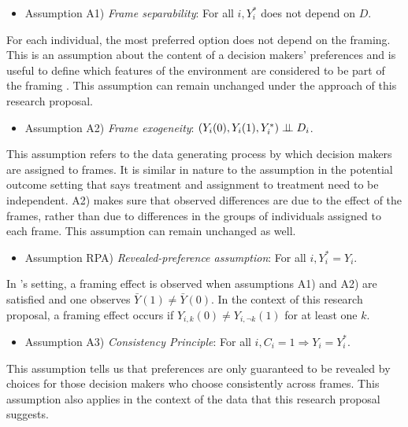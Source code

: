 \begin{itemize}
    \item Assumption A1) \textit{Frame separability}: For all $ i, Y^*_i $ does not depend on $D$.
\end{itemize}

For each individual, the most preferred option does not depend on the framing.
This is an assumption about the content of a decision makers' preferences and is 
useful to define which features of the environment are considered to be part of the framing \parencite[p. 2764]{goldin2020}. This assumption can
remain unchanged under the approach of this research proposal. 

\begin{itemize}
    \item Assumption A2) \textit{Frame exogeneity}: $ (Y_i(0), Y_i(1), Y^*_i) \perp \!\!\! \perp D_i$.
\end{itemize}

This assumption refers to the data generating process by which decision makers are assigned to frames.
It is similar in nature to the assumption in the potential outcome setting that says treatment and
assignment to treatment need to be independent. A2) makes sure that observed differences
are due to the effect of the frames, rather than due to differences in the groups of individuals assigned
to each frame. This assumption can remain unchanged as well.

\begin{itemize}
    \item Assumption RPA) \textit{Revealed-preference assumption}: For all $ i, Y^*_i = Y_i $.
\end{itemize}

In \textcite{goldin2020}'s setting, a framing effect is observed when assumptions A1) and A2)
are satisfied and one observes $\bar{Y}(1) \neq \bar{Y}(0) $. In the context
of this research proposal, a framing effect occurs if $ Y_{i, k}(0) \neq Y_{i, \lnot k}(1)$ for
at least one $k$.

\begin{itemize}
    \item Assumption A3) \textit{Consistency Principle}: For all $ i, C_i = 1 \Rightarrow Y_i = Y^*_i $.
\end{itemize}

This assumption tells us that preferences are only guaranteed
to be revealed by choices for those decision makers who choose consistently across frames.
This assumption also applies in the context of the data that this research proposal suggests.

